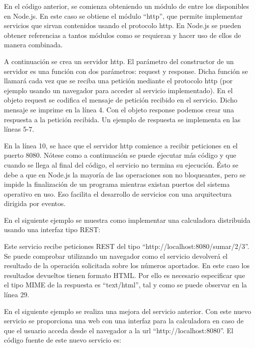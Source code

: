 \documentclass[12pt, a4paper, spanish]{scrartcl}
\begin{document}
En el código anterior, se comienza obteniendo un módulo de entre los disponibles en Node.js. En este caso se obtiene el módulo ``http'', que permite implementar servicios que sirvan contenidos usando el protocolo http. En Node.js se pueden obtener referencias a tantos módulos como se requieran y hacer uso de ellos de manera combinada.

A continuación se crea un servidor http. El parámetro del constructor de un servidor es una función con dos parámetros: request y response. Dicha función se llamará cada vez que se reciba una petición mediante el protocolo http (por ejemplo usando un navegador para acceder al servicio implementado).  En el objeto request se codifica el mensaje de petición recibido en el servicio. Dicho mensaje se imprime en la línea 4. Con el objeto response podemos crear una respuesta a la petición recibida. Un ejemplo de respuesta se implementa en las líneas 5-7.

En la línea 10, se hace que el servidor http comience a recibir peticiones en el puerto 8080. Nótese como a continuación se puede ejecutar más código y que cuando se llega al final del código, el servicio no termina su ejecución. Ésto se debe a que en Node.js la mayoría de las operaciones son no bloqueantes, pero se impide la finalización de un programa mientras existan puertos del sistema operativo en uso. Eso facilita el desarrollo de servicios con una arquitectura dirigida por eventos.

En el siguiente ejemplo se muestra como implementar una calculadora distribuida usando una interfaz tipo REST:



Este servicio recibe peticiones REST del tipo ``http://localhost:8080/sumar/2/3''. Se puede comprobar utilizando un navegador como el servicio devolverá el resultado de la operación solicitada sobre los números aportados. En este caso los resultados devueltos tienen formato HTML. Por ello es necesario especificar que el tipo MIME de la respuesta es ``text/html'', tal y como se puede observar en la línea 29.

En el siguiente ejemplo se realiza una mejora del servicio anterior. Con este nuevo servicio se proporciona una web con una interfaz para la calculadora en caso de que el usuario acceda desde el navegador a la url ``http://localhost:8080''. El código fuente de este nuevo servicio es:


\end{document}
